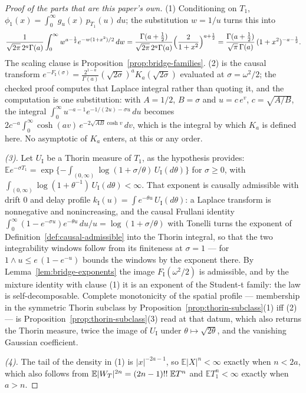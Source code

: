 \begin{proof}[Proof of the parts that are this paper's own]
(1) Conditioning on $T_1$, $\phi_1(x) = \int_0^\infty g_u(x)\,p_{T_1}(u)\,du$; the substitution
$w = 1/u$ turns this into
\[
  \frac{1}{\sqrt{2\pi}\,2^a\Gamma(a)}\int_0^\infty w^{a-\frac12}e^{-w(1+x^2)/2}\,dw
  = \frac{\Gamma(a+\frac12)}{\sqrt{2\pi}\,2^a\Gamma(a)}\Bigl(\frac{2}{1+x^2}\Bigr)^{a+\frac12}
  = \frac{\Gamma(a+\frac12)}{\sqrt\pi\,\Gamma(a)}\,(1+x^2)^{-a-\frac12}.
\]
The scaling clause is Proposition~\ref{prop:bridge-families}. (2) is the causal transform
$e^{-F_{\mathrm I}(\sigma)} = \frac{2^{1-a}}{\Gamma(a)}(\sqrt{2\sigma})^aK_a(\sqrt{2\sigma})$
evaluated at $\sigma = \omega^2/2$; the checked proof computes that Laplace integral rather than
quoting it, and the computation is one substitution: with $A = 1/2$, $B = \sigma$ and
$u = c\,e^{v}$, $c = \sqrt{A/B}$, the integral
$\int_0^\infty u^{-a-1}e^{-1/(2u) - \sigma u}\,du$ becomes
$2c^{-a}\int_0^\infty\cosh(av)\,e^{-2\sqrt{AB}\cosh v}\,dv$, which is the integral by which
$K_a$ is defined here. No asymptotic of $K_a$ enters, at this or any order.

\emph{(3).} Let $U_{\mathrm I}$ be a Thorin measure of $T_1$, as the hypothesis provides:
$\mathbb{E}e^{-\sigma T_1}
= \exp\{-\int_{(0,\infty)}\log(1 + \sigma/\theta)\,U_{\mathrm I}(d\theta)\}$ for $\sigma \ge 0$,
with $\int_{(0,\infty)}\log(1 + \theta^{-1})\,U_{\mathrm I}(d\theta) < \infty$. That exponent is
causally admissible with drift $0$ and delay profile
$k_{\mathrm I}(u) = \int e^{-\theta u}\,U_{\mathrm I}(d\theta)$: a Laplace transform is
nonnegative and nonincreasing, and the causal Frullani identity
$\int_0^\infty(1 - e^{-\sigma u})e^{-\theta u}\,du/u = \log(1 + \sigma/\theta)$ with Tonelli
turns the exponent of Definition~\ref{def:causal-admissible} into the Thorin integral, so that
the two integrability windows follow from its finiteness at $\sigma = 1$ --- for
$1 \wedge u \le e\,(1 - e^{-u})$ bounds the windows by the exponent there. By
Lemma~\ref{lem:bridge-exponents} the image $F_{\mathrm I}(\omega^2/2)$ is admissible, and by the
mixture identity with clause (1) it is an exponent of the Student-t family: the law is
self-decomposable. Complete monotonicity of the spatial profile --- membership in the symmetric
Thorin subclass by Proposition~\ref{prop:thorin-subclass}(1) iff (2) --- is
Proposition~\ref{prop:thorin-subclass}(3) read at that datum, which also returns the Thorin
measure, twice the image of $U_{\mathrm I}$ under $\theta \mapsto \sqrt{2\theta}$, and the
vanishing Gaussian coefficient.

\emph{(4).} The
tail of the density in (1) is $|x|^{-2a-1}$, so $\mathbb{E}|X|^n < \infty$ exactly when
$n < 2a$, which also follows from $\mathbb{E}|W_T|^{2n} = (2n-1)!!\;\mathbb{E}T^n$ and
$\mathbb{E}T_1^n < \infty$ exactly when $a > n$.
\end{proof}


